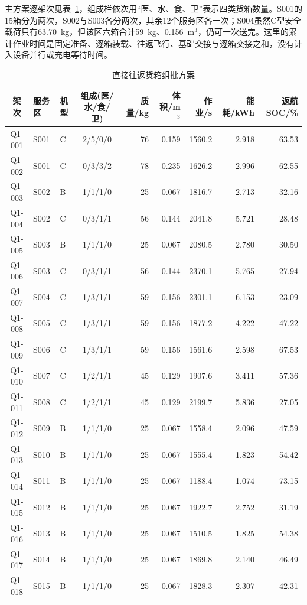 主方案逐架次见表~\ref{tab:q1_batches}，组成栏依次用“医、水、食、卫”表示四类货箱数量。S001的15箱分为两次，S002与S003各分两次，其余12个服务区各一次；S004虽然C型安全载荷只有63.70~kg，但该区六箱合计59~kg、0.156~m$^3$，仍可一次送完。这里的累计作业时间是固定准备、逐箱装载、往返飞行、基础交接与逐箱交接之和，没有计入设备并行或充电等待时间。
\begin{table}[H]
\centering
\caption{直接往返货箱组批方案}\label{tab:q1_batches}
\small
\setlength{\tabcolsep}{4pt}
\begin{tabular}{cllcrrrrr}
\toprule
架次 & 服务区 & 机型 & 组成(医/水/食/卫) & 质量/kg & 体积/m$^3$ & 作业/s & 能耗/kWh & 返航SOC/\% \\
\midrule
Q1-001 & S001 & C & 2/5/0/0 & 76 & 0.159 & 1560.2 & 2.918 & 63.53 \\
Q1-002 & S001 & C & 0/3/3/2 & 78 & 0.235 & 1626.2 & 2.996 & 62.55 \\
Q1-003 & S002 & B & 1/1/1/0 & 25 & 0.067 & 1816.7 & 2.713 & 32.16 \\
Q1-004 & S002 & C & 0/3/1/1 & 56 & 0.144 & 2041.8 & 5.721 & 28.48 \\
Q1-005 & S003 & B & 1/1/1/0 & 25 & 0.067 & 2080.5 & 2.780 & 30.50 \\
Q1-006 & S003 & C & 0/3/1/1 & 56 & 0.144 & 2370.1 & 5.765 & 27.94 \\
Q1-007 & S004 & C & 1/3/1/1 & 59 & 0.156 & 2301.1 & 6.153 & 23.09 \\
Q1-008 & S005 & C & 1/3/1/1 & 59 & 0.156 & 1877.2 & 4.222 & 47.22 \\
Q1-009 & S006 & C & 1/3/1/1 & 59 & 0.156 & 1561.6 & 2.598 & 67.53 \\
Q1-010 & S007 & C & 1/2/1/1 & 45 & 0.129 & 1907.6 & 3.411 & 57.36 \\
Q1-011 & S008 & C & 1/2/1/1 & 45 & 0.129 & 2199.7 & 5.836 & 27.05 \\
Q1-012 & S009 & B & 1/1/1/0 & 25 & 0.067 & 1558.4 & 2.096 & 47.59 \\
Q1-013 & S010 & B & 1/1/1/0 & 25 & 0.067 & 1555.4 & 1.823 & 54.42 \\
Q1-014 & S011 & B & 1/1/1/0 & 25 & 0.067 & 1188.4 & 1.074 & 73.15 \\
Q1-015 & S012 & B & 1/1/1/0 & 25 & 0.067 & 1922.7 & 2.752 & 31.19 \\
Q1-016 & S013 & B & 1/1/1/0 & 25 & 0.067 & 1510.5 & 1.825 & 54.38 \\
Q1-017 & S014 & B & 1/1/1/0 & 25 & 0.067 & 1869.8 & 2.140 & 46.49 \\
Q1-018 & S015 & B & 1/1/1/0 & 25 & 0.067 & 1828.3 & 2.307 & 42.31 \\
\bottomrule
\end{tabular}
\end{table}

